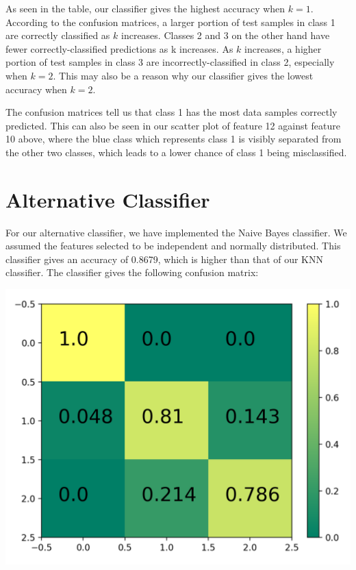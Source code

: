 \documentclass[11pt]{article}
\begin{document}
As seen in the table, our classifier gives the highest accuracy when $k = 1$. According to the confusion matrices, a larger portion of test samples in class 1 are correctly classified as $k$ increases. Classes 2 and 3 on the other hand have fewer correctly-classified predictions as k increases. As $k$ increases, a higher portion of test samples in class 3 are incorrectly-classified in class 2, especially when $k = 2$. This may also be a reason why our classifier gives the lowest accuracy when $k = 2$.

The confusion matrices tell us that class 1 has the most data samples correctly predicted. This can also be seen in our scatter plot of feature 12 against feature 10 above, where the blue class which represents class 1 is visibly separated from the other two classes, which leads to a lower chance of class 1 being misclassified.

\section{Alternative Classifier}
For our alternative classifier, we have implemented the Naive Bayes classifier. We assumed the features selected to be independent and normally distributed. This classifier gives an accuracy of 0.8679, which is higher than that of our KNN classifier. The classifier gives the following confusion matrix:

\begin{center}
\includegraphics[scale=0.2]{naive_bayes_matrix}
\end{center}
\end{document}
